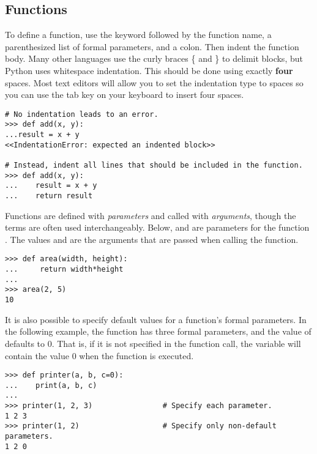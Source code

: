 \subsection*{Functions}

To define a function, use the  keyword followed by the function name, a parenthesized list of formal parameters, and a colon.
Then indent the function body.
Many other languages use the curly braces \{ and \} to delimit blocks, but Python uses whitespace indentation.
This should be done using exactly \textbf{four} spaces.
Most text editors will allow you to set the indentation type to spaces so you can use the tab key on your keyboard to insert four spaces.

\begin{lstlisting}
# No indentation leads to an error.
>>> def add(x, y):
...result = x + y
<<IndentationError: expected an indented block>>

# Instead, indent all lines that should be included in the function.
>>> def add(x, y):
...    result = x + y
...    return result
\end{lstlisting}

Functions are defined with \emph{parameters} and called with \emph{arguments}, though the terms are often used interchangeably.
Below,  and  are parameters for the function .
The values  and  are the arguments that are passed when calling the function.

\begin{lstlisting}
>>> def area(width, height):
...     return width*height
...         
>>> area(2, 5)
10
\end{lstlisting}

It is also possible to specify default values for a function's formal parameters.
In the following example, the function  has three formal parameters, and the value of  defaults to 0.
That is, if it is not specified in the function call, the variable  will contain the value 0 when the function is executed.

\begin{lstlisting}
>>> def printer(a, b, c=0):
...    print(a, b, c)
...
>>> printer(1, 2, 3)                # Specify each parameter.
1 2 3
>>> printer(1, 2)                   # Specify only non-default parameters.
1 2 0
\end{lstlisting} %

